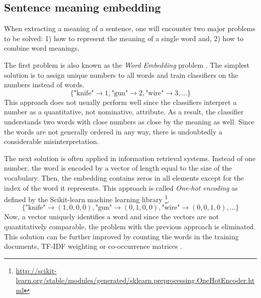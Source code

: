 \documentclass[
  digital, %
  notable,   %
  nolof,     %
  nolot,     %
]{fithesis3}
\begin{document}

\subsection{Sentence meaning embedding}
\label{sec:sentence-meaning}
When extracting a meaning of a sentence, one will encounter two major problems to be solved: 1) how to represent the meaning of a single word and, 2) how to combine word meanings.

The first problem is also known as the \textit{Word Embedding} problem \cite{wordEmbeddings}.
The simplest solution is to assign unique numbers to all words and train classifiers on the numbers instead of words.
$$
\{\text{"knife"} \rightarrow 1, \text{"gun"} \rightarrow 2, \text{"wire"} \rightarrow 3, \dots\}
$$
This approach does not usually perform well since the classifiers interpret a number as a quantitative, not nominative,  attribute.
As a result, the classifier understands two words with close numbers as close by the meaning as well.
Since the words are not generally ordered in any way, there is undoubtedly a considerable misinterpretation.

The next solution is often applied in information retrieval systems.
Instead of one number, the word is encoded by a vector of length equal to the size of the vocabulary.
Then, the embedding contains zeros in all elements except for the index of the word it represents.
This approach is called \textit{One-hot encoding} as defined by the Scikit-learn machine learning library \footnote{\url{http://scikit-learn.org/stable/modules/generated/sklearn.preprocessing.OneHotEncoder.html}}.
$$
\{\text{"knife"} \rightarrow (1,0,0,0), \text{"gun"} \rightarrow (0,1,0,0), \text{"wire"} \rightarrow (0,0,1,0), \dots\}
$$
Now, a vector uniquely identifies a word and since the vectors are not quantitatively comparable, the problem with the previous approach is eliminated.
This solution can be further improved by counting the words in the training documents, TF-IDF weighting or co-occurrence matrices \cite{wordEmbeddings}.
\end{document}
